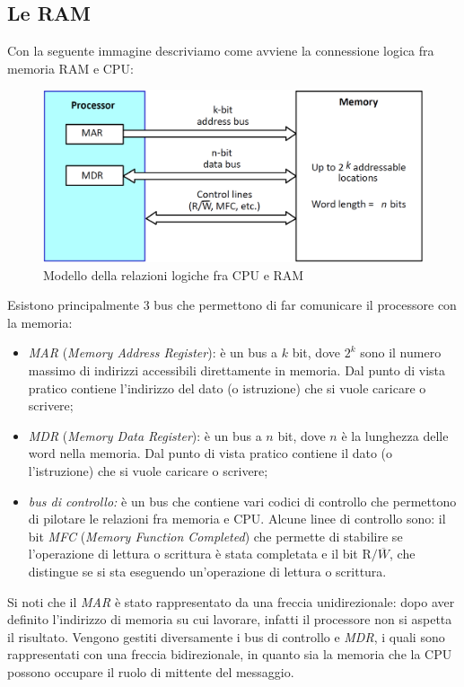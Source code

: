 \documentclass[class=book, crop=false, oneside]{standalone}
\begin{document}
\subsection{Le RAM}
Con la seguente immagine descriviamo come avviene la connessione logica fra memoria RAM e CPU:
\begin{figure}[H]
	\centering
	\includegraphics[width=\textwidth,keepaspectratio]{relazione_cpu_ram.png}
	\caption{Modello della relazioni logiche fra CPU e RAM}
\end{figure}
Esistono principalmente 3 bus che permettono di far comunicare il processore con la memoria:
\begin{itemize}
	\item \emph{MAR} (\emph{Memory Address Register}): è un bus a \(k\) bit, dove \(2^k\) sono il numero massimo di indirizzi accessibili direttamente in memoria. Dal punto di vista pratico contiene l'indirizzo del dato (o istruzione) che si vuole caricare o scrivere;
	\item \emph{MDR} (\emph{Memory Data Register}): è un bus a \(n\) bit, dove \(n\) è la lunghezza delle word nella memoria. Dal punto di vista pratico contiene il dato (o l'istruzione) che si vuole caricare o scrivere;
	\item \emph{bus di controllo:} è un bus che contiene vari codici di controllo che permettono di pilotare le relazioni fra memoria e CPU. Alcune linee di controllo sono: il bit \emph{MFC} (\emph{Memory Function Completed}) che permette di stabilire se l'operazione di lettura o scrittura è stata completata e il bit \emph{\(\textrm{R/}\overline{W}\)}, che distingue se si sta eseguendo un'operazione di lettura o scrittura.
\end{itemize}
Si noti che il \emph{MAR} è stato rappresentato da una freccia unidirezionale: dopo aver definito l'indirizzo di memoria su cui lavorare, infatti il processore non si aspetta il risultato. Vengono gestiti diversamente i bus di controllo e \emph{MDR}, i quali sono rappresentati con una freccia bidirezionale, in quanto sia la memoria che la CPU possono occupare il ruolo di mittente del messaggio.
\end{document}
